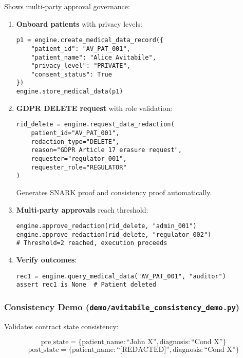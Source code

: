 Shows multi-party approval governance:

\begin{enumerate}
    \item \textbf{Onboard patients} with privacy levels:
    \begin{verbatim}
p1 = engine.create_medical_data_record({
    "patient_id": "AV_PAT_001",
    "patient_name": "Alice Avitabile",
    "privacy_level": "PRIVATE",
    "consent_status": True
})
engine.store_medical_data(p1)
\end{verbatim}
    
    \item \textbf{GDPR DELETE request} with role validation:
    \begin{verbatim}
rid_delete = engine.request_data_redaction(
    patient_id="AV_PAT_001",
    redaction_type="DELETE",
    reason="GDPR Article 17 erasure request",
    requester="regulator_001",
    requester_role="REGULATOR"
)
\end{verbatim}
    Generates SNARK proof and consistency proof automatically.
    
    \item \textbf{Multi-party approvals} reach threshold:
    \begin{verbatim}
engine.approve_redaction(rid_delete, "admin_001")
engine.approve_redaction(rid_delete, "regulator_002")
# Threshold=2 reached, execution proceeds
\end{verbatim}
    
    \item \textbf{Verify outcomes}:
    \begin{verbatim}
rec1 = engine.query_medical_data("AV_PAT_001", "auditor")
assert rec1 is None  # Patient deleted
\end{verbatim}
\end{enumerate}

\subsubsection{Consistency Demo (\texttt{demo/avitabile\_consistency\_demo.py})}

Validates contract state consistency:

\begin{equation}
    \text{pre\_state} = \{\text{patient\_name}: \text{``John X''}, \text{diagnosis}: \text{``Cond X''}\}
\end{equation}
\begin{equation}
    \text{post\_state} = \{\text{patient\_name}: \text{``[REDACTED]''}, \text{diagnosis}: \text{``Cond X''}\}
\end{equation}

